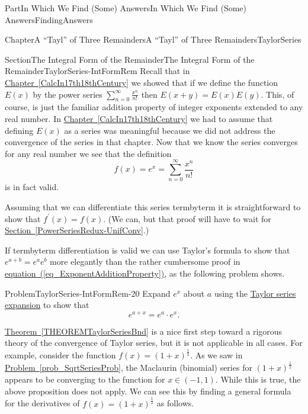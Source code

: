 \documentclass[oneside,10pt,]{book}
\newcommand{\xreffont}{\relax}
\numberwithin{equation}{part}
\begin{document}
\begin{partptx}{Part}{In Which We Find (Some) Answers}{}{In Which We Find (Some) Answers}{}{}{FindingAnswers}
\begin{chapterptx}{Chapter}{A ``Tayl'' of Three Remainders}{}{A ``Tayl'' of Three Remainders}{}{}{TaylorSeries}
\begin{sectionptx}{Section}{The Integral Form of the Remainder}{}{The Integral Form of the Remainder}{}{}{TaylorSeries-IntFormRem}
Recall that in \hyperref[CalcIn17th18thCentury]{Chapter~{\xreffont\ref{CalcIn17th18thCentury}}} we showed that if we define the function \(E(x)\) by the power series \(\sum_{n=0}^\infty\frac{x^n}{n!}\) then \(E(x+y)=E(x)E(y)\).  This, of course, is just the familiar addition property of integer exponents extended to any real number.  In \hyperref[CalcIn17th18thCentury]{Chapter~{\xreffont\ref{CalcIn17th18thCentury}}} we had to assume that defining \(E(x)\) as a series was meaningful because we did not address the convergence of the series in that chapter.  Now that we know the series converges for any real number we see that the definition%
\begin{equation*}
f(x) = e^x = \sum_{n=0}^\infty\frac{x^n}{n!}
\end{equation*}
is in fact valid.%
\par
Assuming that we can differentiate this series term\textendash{}by\textendash{}term it is straightforward to show that \(f^\prime(x) = f(x)\). (We can, but that proof will have to wait  for \hyperref[PowerSeriesRedux-UnifConv]{Section~{\xreffont\ref{PowerSeriesRedux-UnifConv}}}.)%
\par
If term\textendash{}by\textendash{}term differentiation is valid we can use Taylor's formula to show that \(e^{a+b}=e^ae^b\) more elegantly than the rather cumbersome proof in \hyperref[eq_ExponentAdditionProperty]{equation~({\xreffont\ref{eq_ExponentAdditionProperty}})}, as the following problem shows.%
\begin{problem}{Problem}{}{TaylorSeries-IntFormRem-20}%
Expand \(e^x\) about \(a\) using the \hyperref[THEOREMTaylorSeriesBnd]{Taylor series expansion} to show that%
\begin{equation*}
e^{a+x}=e^a\cdot e^x\text{.}
\end{equation*}
%
\end{problem}
\hyperref[THEOREMTaylorSeriesBnd]{Theorem~{\xreffont\ref{THEOREMTaylorSeriesBnd}}} is a nice first step toward a rigorous theory of the convergence of Taylor series, but it is not applicable in all cases.  For example, consider the function \(f(x)=\left(1+x\right)^{\frac12}\).  As we saw in \hyperref[prob_SqrtSeriesProb]{Problem~{\xreffont\ref{prob_SqrtSeriesProb}}}, the Maclaurin (binomial) series for \(\left(1+x\right)^{\frac12}\) appears to be converging to the function for \(x\in(-1,1)\).  While this is true, the above proposition does not apply. We can see this by finding a general formula for the derivatives of \(f(x)=\left(1+x\right)^{\frac12}\) as follows.%
\begin{align*}

\end{align*}
\end{sectionptx}
\end{chapterptx}
\end{partptx}
\end{document}
